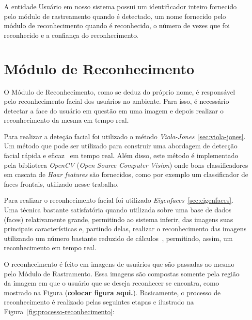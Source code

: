A entidade Usuário em nosso sistema possui um identificador inteiro fornecido pelo módulo de rastreamento quando é detectado, um nome fornecido pelo módulo de reconhecimento quando é reconhecido, o número de vezes que foi reconhecido e a confiança do reconhecimento.

\section{Módulo de Reconhecimento}

	O Módulo de Reconhecimento, como se deduz do próprio nome, é responsável pelo reconhecimento facial dos usuários no ambiente. Para isso, é necessário detectar a face do usuário em questão em uma imagem e depois realizar o reconhecimento da mesma em tempo real. 

	Para realizar a deteção facial foi utilizado o método \textit{Viola-Jones}~\ref{sec:viola-jones}. Um método que pode ser utilizado para construir uma abordagem de detecção facial rápida e eficaz~\cite{violajones} em tempo real. Além disso, este método é implementado pela biblioteca \textit{OpenCV} (\textit{Open Source Computer Vision}) onde bons classificadores em cascata de \textit{Haar features} são fornecidos, como por exemplo um classificador de faces frontais, utilizado nesse trabalho.

	Para realizar o reconhecimento facial foi utilizado \textit{Eigenfaces}~\ref{sec:eigenfaces}. Uma técnica bastante satisfatória quando utilizada sobre uma base de dados (faces) relativamente grande, permitindo ao sistema inferir, das imagens suas principais características e, partindo delas, realizar o reconhecimento das imagens utilizando um número bastante reduzido de cálculos~\cite{artigo-eigenface}, permitindo, assim, um reconhecimento em tempo real.

	O reconhecimento é feito em imagens de usuários que são passadas ao mesmo pelo Módulo de Rastramento. Essa imagens são compostas somente pela região da imagem em que o usuário que se deseja reconhecer se encontra, como mostrado na Figura (\textbf{colocar figura aqui.}). Basicamente, o processo de reconhecimento é realizado pelas seguintes etapas e ilustrado na Figura~\ref{fig:processo-reconhecimento}:

